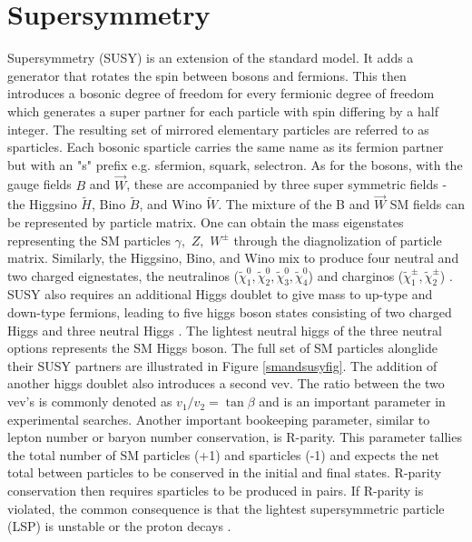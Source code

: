 \section{Supersymmetry}

Supersymmetry (SUSY) is an extension of the standard model. It adds a generator that rotates the spin between bosons and fermions. This then introduces a bosonic degree of freedom for every fermionic degree of freedom \cite{Baer:2007izw} which generates a super partner for each particle with spin differing by a half integer.  The resulting set of mirrored elementary particles are referred to as sparticles. Each bosonic sparticle carries the same name as its fermion partner but with an "s" prefix e.g. sfermion, squark, selectron. As for the bosons, with the gauge fields $B$ and $\vec{W}$, these are accompanied by three super symmetric fields - the Higgsino $\tilde{H}$, Bino $\tilde{B}$, and Wino $\tilde{W}$. The mixture of the B and $\vec{W}$ SM fields can be represented by particle matrix. One can obtain the  mass eigenstates representing the SM particles $\gamma, \, \, Z, \, \, W^\pm$ through the diagnolization of particle matrix. Similarly, the Higgsino, Bino, and Wino mix to produce four neutral and two charged eignestates, the neutralinos ($\tilde{\chi}^0_1, \tilde{\chi}^0_2, \tilde{\chi}^0_3, \tilde{\chi}^0_4$)  and charginos ($\tilde{\chi}^\pm_1, \tilde{\chi}^\pm_2$) \cite{DJOUADI_2008}. SUSY also requires an additional Higgs doublet to give mass to up-type and down-type fermions,  leading to five higgs boson states consisting of two charged Higgs and three neutral Higgs \cite{Adam:2021rrw}. The lightest neutral higgs of the three neutral options represents the SM Higgs boson. The full set of SM particles alonglide their SUSY partners are illustrated in Figure \ref{smandsusyfig}. The addition of another higgs doublet also introduces a second vev. The ratio between the two vev's  is commonly denoted as $v_1/v_2 = \tan \beta$ and is an important parameter in experimental searches. Another important bookeeping parameter, similar to lepton number or baryon number conservation, is R-parity. This parameter tallies the total number of SM particles (+1) and sparticles (-1) and expects the net total between particles to be conserved in the initial and final states. R-parity conservation then requires sparticles to be produced in pairs. If R-parity is violated, the common consequence is that the lightest supersymmetric particle (LSP) is unstable or the proton decays \cite{Farrar:1978xj}. 




